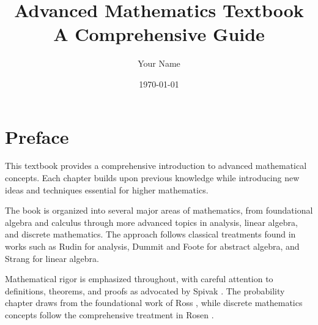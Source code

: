 \documentclass[12pt,letterpaper]{book}
\title{Advanced Mathematics Textbook\\
       \large A Comprehensive Guide}
\author{Your Name}
\date{\today}
\theoremstyle{definition}
\begin{document}
\maketitle

\frontmatter
\tableofcontents
\listoffigures
\listoftables

\chapter*{Preface}

This textbook provides a comprehensive introduction to advanced mathematical concepts. Each chapter builds upon previous knowledge while introducing new ideas and techniques essential for higher mathematics.

The book is organized into several major areas of mathematics, from foundational algebra and calculus through more advanced topics in analysis, linear algebra, and discrete mathematics. The approach follows classical treatments found in works such as Rudin \cite{rudin1976principles} for analysis, Dummit and Foote \cite{dummit2004abstract} for abstract algebra, and Strang \cite{strang2016introduction} for linear algebra.

Mathematical rigor is emphasized throughout, with careful attention to definitions, theorems, and proofs as advocated by Spivak \cite{spivak2008calculus}. The probability chapter draws from the foundational work of Ross \cite{ross2014first}, while discrete mathematics concepts follow the comprehensive treatment in Rosen \cite{rosen2019discrete}.

\mainmatter










\appendix



\backmatter


\end{document}
